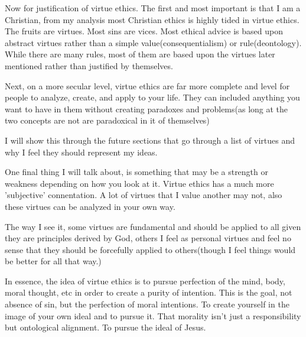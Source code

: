 \par Now for justification of virtue ethics. The first and most important is that I am a Christian, from my analysis most Christian ethics is highly tided in virtue ethics. The fruits are virtues. Most sins are vices. Most ethical advice is based upon abstract virtues rather than a simple value(consequentialism) or rule(deontology). While there are many rules, most of them are based upon the virtues later mentioned rather than justified by themselves.
\par Next, on a more secular level, virtue ethics are far more complete and level for people to analyze, create, and apply to your life. They can included anything you want to have in them without creating paradoxes and problems(as long at the two concepts are not are paradoxical in it of themselves)
\par I will show this through the future sections that go through a list of virtues and why I feel they should represent my ideas.
\par One final thing I will talk about, is something that may be a strength or weakness depending on how you look at it. Virtue ethics has a much more 'subjective' connentation. A lot of virtues that I value another may not, also these virtues can be analyzed in your own way.
\par The way I see it, some virtues are fundamental and should be applied to all given they are principles derived by God, others I feel as personal virtues and feel no sense that they should be forcefully applied to others(though I feel things would be better for all that way.)
\par In essence, the idea of virtue ethics is to pursue perfection of the mind, body, moral thought, etc in order to create a purity of intention. This is the goal, not absence of sin, but the perfection of moral intentions. To create yourself in the image of your own ideal and to pursue it. That morality isn't just a responsibility but ontological alignment. To pursue the ideal of Jesus.
